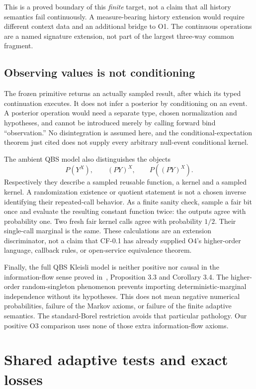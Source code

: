 \documentclass[11pt,a4paper]{article}
\theoremstyle{definition}
\begin{document}
This is a proved boundary of this \emph{finite} target, not a claim that all
history semantics fail continuously. A measure-bearing history extension
would require different context data and an additional bridge to O1.
The continuous operations are a named signature extension, not part of the
largest three-way common fragment.

\subsection{Observing values is not conditioning}
The frozen primitive returns an actually sampled result, after which its
typed continuation executes. It does not infer a posterior by conditioning
on an event. A posterior operation would need a separate type, chosen
normalization and hypotheses, and cannot be introduced merely by calling
forward bind ``observation.'' No disintegration is assumed here, and the
conditional-expectation theorem just cited does not supply every arbitrary
null-event conditional kernel.

The ambient QBS model also distinguishes the objects
\[
 P(Y^X),\qquad(PY)^X,\qquad P((PY)^X).
\]
Respectively they describe a sampled reusable function, a kernel and a
sampled kernel. A randomization existence or quotient statement is not a
chosen inverse identifying their repeated-call behavior. As a finite
sanity check, sample a fair bit once and evaluate the resulting constant
function twice: the outputs agree with probability one. Two fresh fair
kernel calls agree with probability $1/2$. Their single-call marginal is
the same. These calculations are an extension discriminator, not a claim
that CF-0.1 has already supplied O4's higher-order language, callback rules,
or open-service equivalence theorem.

Finally, the full QBS Kleisli model is neither positive nor causal in the
information-flow sense proved in~\cite{Dilations}, Proposition 3.3 and
Corollary 3.4. The higher-order random-singleton phenomenon prevents importing
deterministic-marginal independence without its hypotheses. This does not
mean negative numerical probabilities, failure of the Markov axioms, or
failure of the finite adaptive semantics. The standard-Borel restriction
avoids that particular pathology. Our positive O3 comparison uses none of
those extra information-flow axioms.

\section{Shared adaptive tests and exact losses}\label{sec:tests}
\end{document}
